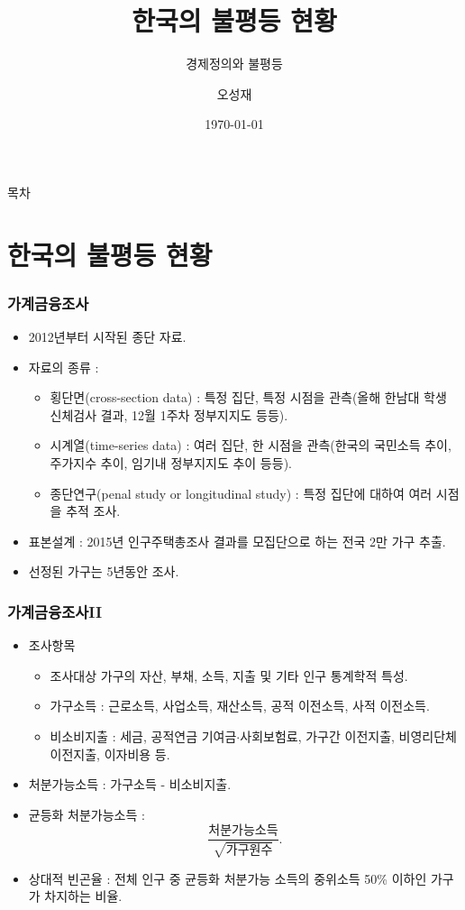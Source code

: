 \documentclass[aspectratio=169,xcolor=dvipsnames,handout]{beamer}
\title[한국의 불평등 현황]{한국의 불평등 현황} %
\subtitle{경제정의와 불평등}
\author[오성재]{오성재}
\institute[HNU] %
{
    한남대학교 \\
    탈메이지 교양학부 \\
}
\date{\today} %
\begin{document}
\begin{frame}
    \titlepage
\end{frame}

\begin{frame}{목차}
    \tableofcontents
\end{frame}
\section{한국의 불평등 현황}
\begin{frame}[<+->]
\frametitle{가계금융조사}
    \begin{itemize}
        \item 2012년부터 시작된 종단 자료.
        \item 자료의 종류 : 
        \begin{itemize}
            \item 횡단면(cross-section data) : 특정 집단, 특정 시점을 관측(올해 한남대 학생 신체검사 결과, 12월 1주차 정부지지도 등등).
            \item 시계열(time-series data) : 여러 집단, 한 시점을 관측(한국의 국민소득 추이, 주가지수 추이, 임기내 정부지지도 추이 등등).
            \item 종단연구(penal study or longitudinal study) : 특정 집단에 대하여 여러 시점을 추적 조사.
        \end{itemize}
        \item 표본설계 : 2015년 인구주택총조사 결과를 모집단으로 하는 전국 2만 가구 추출.
        \item 선정된 가구는 5년동안 조사.
    \end{itemize}
\end{frame}

\begin{frame}[<+->]
\frametitle{가계금융조사II}
    \begin{itemize}
        \item 조사항목
        \begin{itemize}
            \item 조사대상 가구의 자산, 부채, 소득, 지출 및 기타 인구 통계학적 특성.
            \item 가구소득 : 근로소득, 사업소득, 재산소득, 공적 이전소득, 사적 이전소득.
            \item 비소비지출 : 세금, 공적연금 기여금$\cdot$사회보험료, 가구간 이전지출, 비영리단체 이전지출, 이자비용 등.
        \end{itemize}
        \item 처분가능소득 : 가구소득 - 비소비지출.
        \item 균등화 처분가능소득 : 
        $$ \frac{ \text{처분가능소득}}{ \sqrt{\text{가구원수}}}.$$
        \item 상대적 빈곤율 : 전체 인구 중 균등화 처분가능 소득의 중위소득 50\% 이하인 가구가 차지하는 비율.
    \end{itemize}
\end{frame}
\end{document}
